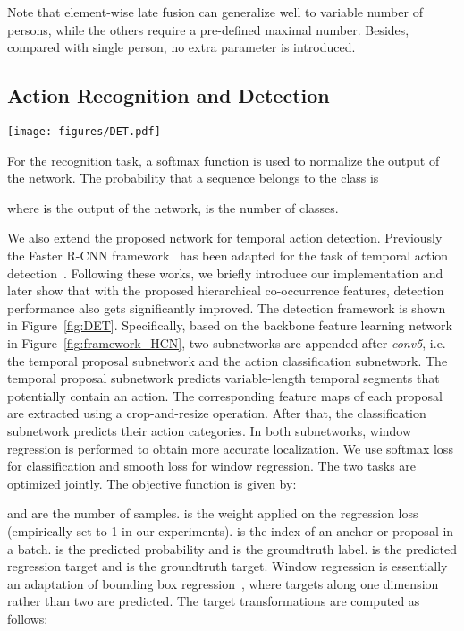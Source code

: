 \documentclass{article}
\begin{document}
Note that element-wise late fusion can generalize well to variable number of persons, while the others require a pre-defined maximal number. Besides, compared with single person, no extra parameter is introduced.

\subsection{Action Recognition and Detection}

\begin{figure*}[htbp]
  \centering
  \texttt{[image: figures/DET.pdf]}
  \caption{The temporal action detection framework. The backbone network is described in Figure~\ref{fig:framework_HCN}. Two subnetworks are designed for temporal proposal segmentation and action classification respectively.
  \label{fig:DET}}
\end{figure*}

For the recognition task, a softmax function is used to normalize the output of the network. The probability that a sequence  belongs to the  class is

where  is the output of the network,  is the number of classes.

We also extend the proposed network for temporal action detection. Previously the Faster R-CNN framework~\cite{Ren2015Faster} has been adapted for the task of temporal action detection~\cite{Rc3d,Li_2017_ICMEW}. Following these works, we briefly introduce our implementation and later show that with the proposed hierarchical co-occurrence features, detection performance also gets significantly improved. The detection framework is shown in Figure~\ref{fig:DET}. Specifically, based on the backbone feature learning network in Figure~\ref{fig:framework_HCN}, two subnetworks are appended after \emph{conv5}, i.e. the temporal proposal subnetwork and the action classification subnetwork. The temporal proposal subnetwork predicts variable-length temporal segments that potentially contain an action. The corresponding feature maps of each proposal are extracted using a crop-and-resize operation. After that, the classification subnetwork predicts their action categories. In both subnetworks, window regression is performed to obtain more accurate localization. We use softmax loss for classification and smooth  loss for window regression. The two tasks are optimized jointly. The objective function is given by:

 and  are the number of samples.  is the weight applied on the regression loss (empirically set to 1 in our experiments).  is the index of an anchor or proposal in a batch.  is the predicted probability and  is the groundtruth label.  is the predicted regression target and  is the groundtruth target. Window regression is essentially an adaptation of bounding box regression~\cite{girshick2014rich}, where targets along one dimension rather than two are predicted. The target transformations are computed as follows:
\end{document}
